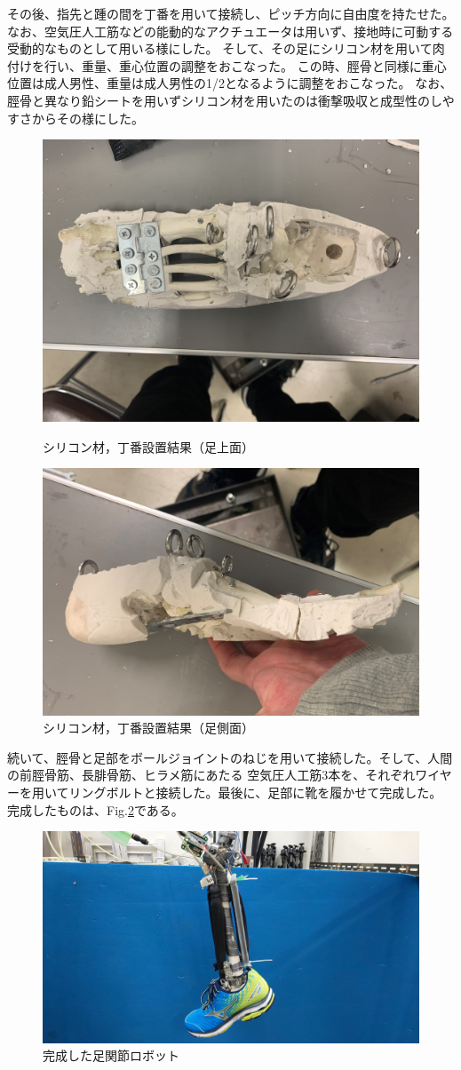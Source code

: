 その後、指先と踵の間を丁番を用いて接続し、ピッチ方向に自由度を持たせた。
なお、空気圧人工筋などの能動的なアクチュエータは用いず、接地時に可動する受動的なものとして用いる様にした。
そして、その足にシリコン材を用いて肉付けを行い、重量、重心位置の調整をおこなった。
この時、脛骨と同様に重心位置は成人男性、重量は成人男性の1/2となるように調整をおこなった。
なお、脛骨と異なり鉛シートを用いずシリコン材を用いたのは衝撃吸収と成型性のしやすさからその様にした。
\newpage
\begin{figure}[h]
    \begin{center}
     \includegraphics[width=0.6\columnwidth,clip]{./2_measurement/siliconfoot.eps}
     \caption{シリコン材，丁番設置結果（足上面）}
     \label{fig:foot2}
    \end{center}
    \begin{center}
     \includegraphics[width=0.6\columnwidth,clip]{./2_measurement/siliconfootside.eps}
     \caption{シリコン材，丁番設置結果（足側面）}
     \label{fig:footside2}
    \end{center}
\end{figure}

続いて、脛骨と足部をボールジョイントのねじを用いて接続した。そして、人間の前脛骨筋、長腓骨筋、ヒラメ筋にあたる
空気圧人工筋3本を、それぞれワイヤーを用いてリングボルトと接続した。最後に、足部に靴を履かせて完成した。
完成したものは、Fig.\ref{fig:legPb}である。

\begin{figure}[h]
    \begin{center}
     \includegraphics[width=0.75\columnwidth,clip]{./2_measurement/fin.eps}
     \caption{完成した足関節ロボット}
     \label{fig:legPb}
    \end{center}
\end{figure}
